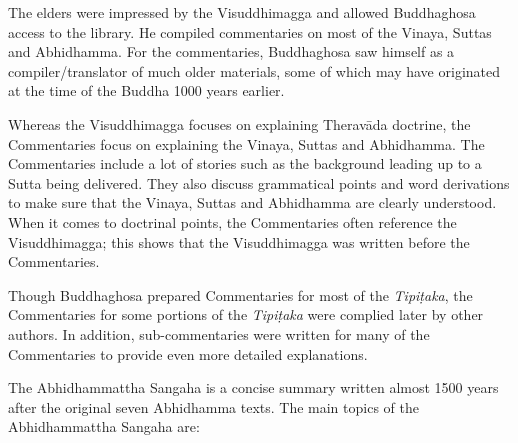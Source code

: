 The elders were impressed by the Visuddhimagga and allowed Buddhaghosa access to the library. He compiled commentaries on most of the Vinaya, Suttas and Abhidhamma. For the commentaries, Buddhaghosa saw himself as a compiler/translator of much older materials, some of which may have originated at the time of the Buddha 1000 years earlier.

Whereas the Visuddhimagga focuses on explaining Theravāda doctrine, the Commentaries focus on explaining the Vinaya, Suttas and Abhidhamma. The Commentaries include a lot of stories such as the background leading up to a Sutta being delivered. They also discuss grammatical points and word derivations to make sure that the Vinaya, Suttas and Abhidhamma are clearly understood. When it comes to doctrinal points, the Commentaries often reference the Visuddhimagga; this shows that the Visuddhimagga was written before the Commentaries. 

Though Buddhaghosa prepared Commentaries for most of the \textit{Tipiṭaka}, the Commentaries for some portions of the \textit{Tipiṭaka} were complied later by other authors. In addition, sub-commentaries were written for many of the Commentaries to provide even more detailed explanations.

\pagebreak


The Abhidhammattha Sangaha is a concise summary written almost 1500 years after the original seven Abhidhamma texts. The main topics of the Abhidhammattha Sangaha are:

